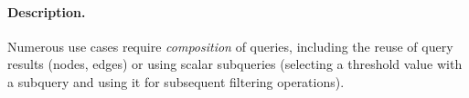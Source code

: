 
\paragraph{Description.}

Numerous use cases require \emph{composition} of queries, including the reuse of
query results (\eg nodes, edges) or using scalar subqueries (\eg selecting a
threshold value with a subquery and using it for subsequent filtering
operations).


